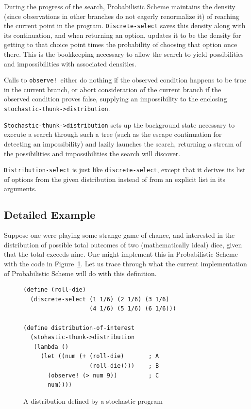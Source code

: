 \documentclass[10pt]{sigplanconf}
\newcommand{\code}[1]{\texttt{#1}}
\begin{document}
During the progress of the search, Probabilistic Scheme maintains the
density (since observations in other branches do
not eagerly renormalize it) of reaching the current point in the program.
\code{Discrete-select} saves this density along with its continuation,
and when returning an option, updates it to be the density for getting
to that choice point times the probability of choosing that option
once there.  This is the bookkeeping necessary to allow the search
to yield possibilities and impossibilities with associated densities.

Calls to \code{observe!}\ either do nothing if the observed condition
happens to be true in the current branch, or abort consideration of
the current branch if the observed condition proves false, supplying
an impossibility to the enclosing
\code{stochastic-thunk->distribution}.

\code{Stochastic-thunk->distribution} sets up
the background state necessary to execute a search through such a tree (such
as the escape continuation for detecting an impossibility) and lazily
launches the search, returning a stream of the possibilities and
impossibilities the search will discover.

\code{Distribution-select} is just like \code{discrete-select}, except
that it derives its list of options from the given distribution
instead of from an explicit list in its arguments.

\subsection{Detailed Example}
\label{sec:walkthrough}

Suppose one were playing some strange game of chance, and interested
in the distribution of possible total outcomes of two (mathematically
ideal) dice, given that the total exceeds nine.  One might implement
this in Probabilistic Scheme with the code in
Figure~\ref{walkthrough-program}.  Let us trace through what the
current implementation of Probabilistic Scheme will do with this
definition.

\begin{figure}[htbp]
\begin{verbatim}
(define (roll-die)
  (discrete-select (1 1/6) (2 1/6) (3 1/6)
                   (4 1/6) (5 1/6) (6 1/6)))

(define distribution-of-interest
  (stohastic-thunk->distribution
   (lambda ()
     (let ((num (+ (roll-die)       ; A
                   (roll-die))))    ; B
       (observe! (> num 9))         ; C
       num))))
\end{verbatim}
\caption{A distribution defined by a stochastic program}
\label{walkthrough-program}
\end{figure}
\end{document}
